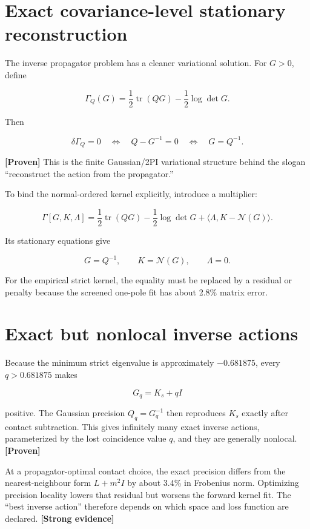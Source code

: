 \documentclass[11pt,a4paper,openany]{report}
\newcommand{\statusProven}{\textcolor{fingreen}{[Proven]}}
\newcommand{\statusStrong}{\textcolor{finblue}{[Strong evidence]}}
\begin{document}
\section{Exact covariance-level stationary reconstruction}

The inverse propagator problem has a cleaner variational solution. For \(G>0\), define

\[
\Gamma_Q(G)
=\frac12\operatorname{tr}(QG)-\frac12\log\det G.
\]

Then

\[
\delta\Gamma_Q=0
\quad\Longleftrightarrow\quad
Q-G^{-1}=0
\quad\Longleftrightarrow\quad
G=Q^{-1}.
\]

\textbf{\statusProven{}} This is the finite Gaussian/\allowbreak{}2PI variational structure behind the slogan “reconstruct the action from the propagator.”

To bind the normal-ordered kernel explicitly, introduce a multiplier:

\[
\Gamma[G,K,\Lambda]
=\frac12\operatorname{tr}(QG)
-\frac12\log\det G
+\langle\Lambda,K-\mathcal N(G)\rangle.
\]

Its stationary equations give

\[
G=Q^{-1},
\qquad
K=\mathcal N(G),
\qquad
\Lambda=0.
\]

For the empirical strict kernel, the equality must be replaced by a residual or penalty because the screened one-pole fit has about 2.8\% matrix error.

\section{Exact but nonlocal inverse actions}

Because the minimum strict eigenvalue is approximately \(-0.681875\), every \(q>0.681875\) makes

\[
G_q=K_s+qI
\]

positive. The Gaussian precision \(Q_q=G_q^{-1}\) then reproduces \(K_s\) exactly after contact subtraction. This gives infinitely many exact inverse actions, parameterized by the lost coincidence value \(q\), and they are generally nonlocal. \textbf{\statusProven{}}

At a propagator-optimal contact choice, the exact precision differs from the nearest-neighbour form \(L+m^2I\) by about 3.4\% in Frobenius norm. Optimizing precision locality lowers that residual but worsens the forward kernel fit. The “best inverse action” therefore depends on which space and loss function are declared. \textbf{\statusStrong{}}
\end{document}
